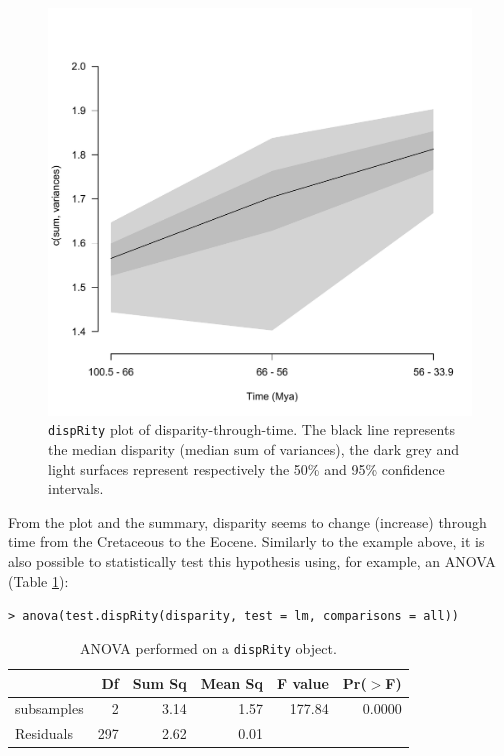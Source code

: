 \documentclass[12pt,letterpaper]{article}
\newcommand{\disp}{\texttt{dispRity} }
\begin{document}
\begin{figure}[!htbp]
\centering
   \includegraphics[width=1\textwidth]{plot_example_time.pdf} 
\caption{\disp plot of disparity-through-time. The black line represents the median disparity (median sum of variances), the dark grey and light surfaces represent respectively the 50\% and 95\% confidence intervals.}
\label{Fig:plot_time}
\end{figure}

From the plot and the summary, disparity seems to change (increase) through time from the Cretaceous to the Eocene.
Similarly to the example above, it is also possible to statistically test this hypothesis using, for example, an ANOVA (Table \ref{Tab:anova}): 

\noindent \texttt{> anova(test.dispRity(disparity, test = lm, comparisons = \textquotedbl all\textquotedbl))}

\begin{table}[ht]
\centering
\begin{tabular}{lrrrrr}
  \hline
 & Df & Sum Sq & Mean Sq & F value & Pr($>$F) \\ 
  \hline
subsamples & 2 & 3.14 & 1.57 & 177.84 & 0.0000 \\ 
  Residuals & 297 & 2.62 & 0.01 &  &  \\ 
   \hline
\end{tabular}
\caption{ANOVA performed on a \disp object.}
\label{Tab:anova}
\end{table}
\end{document}
